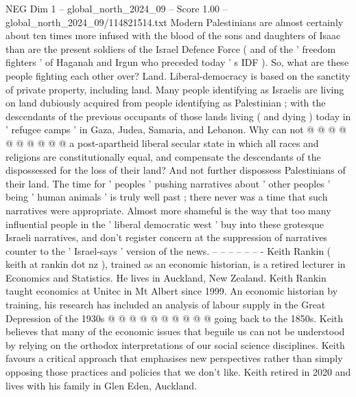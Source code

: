 \begin{textsample}{NEG Dim 1 – global\_north\_2024\_09 – Score 1.00 – global\_north\_2024\_09/114821514.txt}
Modern Palestinians are almost certainly about ten times more infused with the blood of the sons and daughters of Isaac than are the present soldiers of the Israel Defence Force ( and of the ' freedom fighters ' of Haganah and Irgun who preceded today ' s IDF ).
So, what are these people fighting each other over?
Land.
Liberal-democracy is based on the sanctity of private property, including land.
Many people identifying as Israelis are living on land dubiously acquired from people identifying as Palestinian ; with the descendants of the previous occupants of those lands living ( and dying ) today in ' refugee camps ' in Gaza, Judea, Samaria, and Lebanon.
Why can not @ @ @ @ @ @ @ @ @ @ a post-apartheid liberal secular state in which all races and religions are constitutionally equal, and compensate the descendants of the dispossessed for the loss of their land?
And not further dispossess Palestinians of their land.
The time for ' peoples ' pushing narratives about ' other peoples ' being ' human animals ' is truly well past ; there never was a time that such narratives were appropriate.
Almost more shameful is the way that too many influential people in the ' liberal democratic west ' buy into these grotesque Israeli narratives, and don't register concern at the suppression of narratives counter to the ' Israel-says ' version of the news. -- -- -- -- -- -- - Keith Rankin ( keith at rankin dot nz ), trained as an economic historian, is a retired lecturer in Economics and Statistics.
He lives in Auckland, New Zealand.
Keith Rankin taught economics at Unitec in Mt Albert since 1999.
An economic historian by training, his research has included an analysis of labour supply in the Great Depression of the 1930s @ @ @ @ @ @ @ @ @ @ going back to the 1850s.
Keith believes that many of the economic issues that beguile us can not be understood by relying on the orthodox interpretations of our social science disciplines.
Keith favours a critical approach that emphasises new perspectives rather than simply opposing those practices and policies that we don't like.
Keith retired in 2020 and lives with his family in Glen Eden, Auckland.

\end{textsample}
